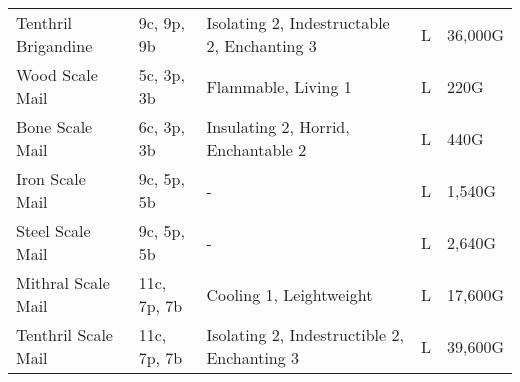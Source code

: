 \begin{longtable}{p{3.5cm} | p{1.5cm} | p{5cm} | p{1cm} | p{1.25cm}}
	Tenthril Brigandine & 9c, 9p, 9b & Isolating 2, Indestructable 2, Enchanting 3 & L & 36,000G\\
	
	Wood Scale Mail & 5c, 3p, 3b & Flammable, Living 1 & L & 220G\\
	
	Bone Scale Mail & 6c, 3p, 3b & Insulating 2, Horrid, Enchantable 2 & L & 440G\\
	
	Iron Scale Mail & 9c, 5p, 5b & - & L & 1,540G\\
	
	Steel Scale Mail & 9c, 5p, 5b & - & L & 2,640G\\
	
	Mithral Scale Mail & 11c, 7p, 7b & Cooling 1, Leightweight & L & 17,600G\\
	
	Tenthril Scale Mail & 11c, 7p, 7b & Isolating 2, Indestructible 2, Enchanting 3 & L & 39,600G\\
\end{longtable}
\twocolumn